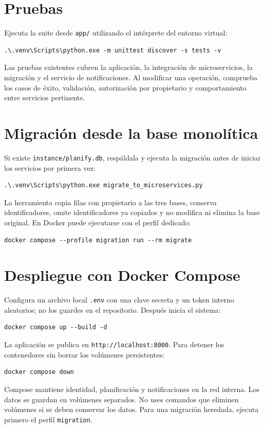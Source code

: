 \documentclass[12pt,a4paper]{article}
\begin{document}
\section{Pruebas}
Ejecuta la suite desde \texttt{app/} utilizando el intérprete del entorno virtual:
\begin{lstlisting}
.\.venv\Scripts\python.exe -m unittest discover -s tests -v
\end{lstlisting}
Las pruebas existentes cubren la aplicación, la integración de microservicios, la migración y el servicio de notificaciones. Al modificar una operación, comprueba los casos de éxito, validación, autorización por propietario y comportamiento entre servicios pertinente.

\section{Migración desde la base monolítica}
Si existe \texttt{instance/planify.db}, respáldala y ejecuta la migración antes de iniciar los servicios por primera vez:
\begin{lstlisting}
.\.venv\Scripts\python.exe migrate_to_microservices.py
\end{lstlisting}
La herramienta copia filas con propietario a las tres bases, conserva identificadores, omite identificadores ya copiados y no modifica ni elimina la base original. En Docker puede ejecutarse con el perfil dedicado:
\begin{lstlisting}
docker compose --profile migration run --rm migrate
\end{lstlisting}

\section{Despliegue con Docker Compose}
Configura un archivo local \texttt{.env} con una clave secreta y un token interno aleatorios; no los guardes en el repositorio. Después inicia el sistema:
\begin{lstlisting}
docker compose up --build -d
\end{lstlisting}
La aplicación se publica en \texttt{http://localhost:8000}. Para detener los contenedores sin borrar los volúmenes persistentes:
\begin{lstlisting}
docker compose down
\end{lstlisting}
Compose mantiene identidad, planificación y notificaciones en la red interna. Los datos se guardan en volúmenes separados. No uses comandos que eliminen volúmenes si se deben conservar los datos. Para una migración heredada, ejecuta primero el perfil \texttt{migration}.
\end{document}
